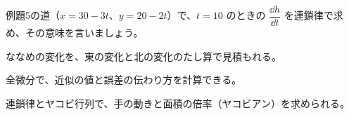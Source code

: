 \bkproblem 例題5の道（$x=30-3t$、$y=20-2t$）で、$t=10$ のときの $\dfrac{\dd h}{\dd t}$ を連鎖律で求め、その意味を言いましょう。

\begin{furikaeri}
\begin{checklist}
\item ななめの変化を、東の変化と北の変化のたし算で見積もれる。
\item 全微分で、近似の値と誤差の伝わり方を計算できる。
\item 連鎖律とヤコビ行列で、手の動きと面積の倍率（ヤコビアン）を求められる。
\end{checklist}
\end{furikaeri}

